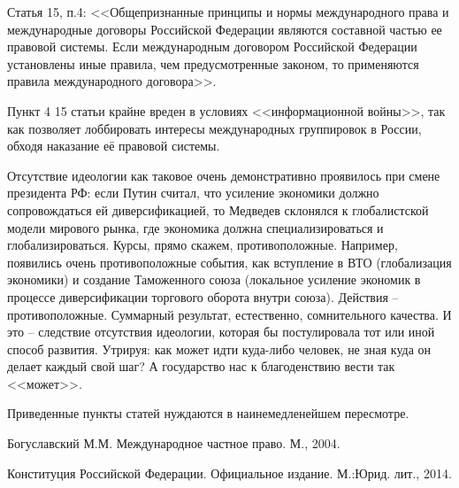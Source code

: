\documentclass[a4paper,12pt]{diss_4}
\begin{document}
Статья 15, п.4: <<Общепризнанные принципы и нормы международного права и международные договоры Российской Федерации являются составной частью ее правовой системы. Если международным договором Российской Федерации установлены иные правила, чем предусмотренные законом, то применяются правила международного договора>>.

Пункт 4 15 статьи крайне вреден в условиях <<информационной войны>>, так как позволяет лоббировать интересы международных группировок в России, обходя наказание её правовой системы.

Отсутствие идеологии как таковое очень демонстративно проявилось при смене президента РФ: если Путин считал, что усиление экономики должно сопровождаться ей диверсификацией, то Медведев склонялся к глобалистской модели мирового рынка, где экономика должна специализироваться и глобализироваться. Курсы, прямо скажем, противоположные. Например, появились очень противоположные события, как вступление в ВТО (глобализация экономики) и создание Таможенного союза (локальное усиление экономик в процессе диверсификации торгового оборота внутри союза). Действия -- противоположные. Суммарный результат, естественно, сомнительного качества. И это -- следствие отсутствия идеологии, которая бы постулировала тот или иной способ развития. Утрируя: как может идти куда-либо человек, не зная куда он делает каждый свой шаг? А государство нас к благоденствию вести так <<может>>. 

Приведенные пункты статей нуждаются в наинемедленейшем пересмотре.

\begin{thebibliography}{99}

 Богуславский М.М. Международное частное право. М., 2004. 

 Конституция Российской Федерации. Официальное издание. М.:Юрид. лит., 2014.

\end{thebibliography}
\end{document}
